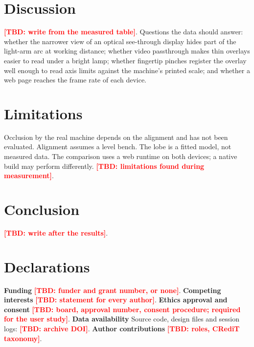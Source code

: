 \documentclass[11pt]{article}
\newcommand{\tbd}[1]{\textcolor{red}{\textbf{[TBD: #1]}}}
\begin{document}
\section{Discussion}
\tbd{write from the measured table}. Questions the data should answer: whether the narrower view of an optical
see-through display hides part of the light-arm arc at working distance; whether video passthrough makes thin overlays
easier to read under a bright lamp; whether fingertip pinches register the overlay well enough to read axis limits
against the machine's printed scale; and whether a web page reaches the frame rate of each device.

\section{Limitations}
Occlusion by the real machine depends on the alignment and has not been evaluated. Alignment assumes a level bench. The lobe is a fitted model, not
measured data. The comparison uses a web runtime on both devices; a native build may perform differently.
\tbd{limitations found during measurement}.

\section{Conclusion}
\tbd{write after the results}.

\section*{Declarations}
\textbf{Funding} \tbd{funder and grant number, or none}.\quad
\textbf{Competing interests} \tbd{statement for every author}.\quad
\textbf{Ethics approval and consent} \tbd{board, approval number, consent procedure; required for the user study}.\quad
\textbf{Data availability} Source code, design files and session logs: \tbd{archive DOI}.\quad
\textbf{Author contributions} \tbd{roles, CRediT taxonomy}.

\printbibliography
\end{document}
